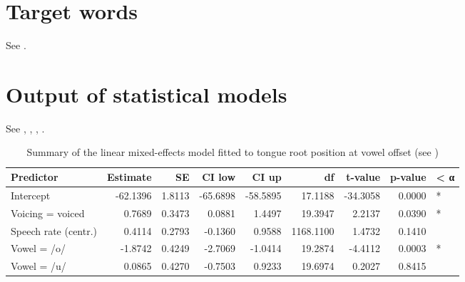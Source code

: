 \documentclass[preprint]{JASAnew}
\begin{document}
\appendix

\hypertarget{target-words}{%
\section{Target words}\label{target-words}}

\label{a:targets}

See .


\hypertarget{output-of-statistical-models}{%
\section{Output of statistical
models}\label{output-of-statistical-models}}

See , ,
, .

\begin{table}

\caption{\label{tab:tra-lm-table}Summary of the linear mixed-effects model fitted to tongue root position at vowel offset (see )}
\centering
\fontsize{10}{12}\selectfont
\begin{tabular}[t]{lrrrrrrrl}
\toprule
Predictor & Estimate & SE & CI low & CI up & df & t-value & p-value & < α\\
\midrule
Intercept & -62.1396 & 1.8113 & -65.6898 & -58.5895 & 17.1188 & -34.3058 & 0.0000 & *\\
Voicing = voiced & 0.7689 & 0.3473 & 0.0881 & 1.4497 & 19.3947 & 2.2137 & 0.0390 & *\\
Speech rate (centr.) & 0.4114 & 0.2793 & -0.1360 & 0.9588 & 1168.1100 & 1.4732 & 0.1410 & \\
Vowel = /o/ & -1.8742 & 0.4249 & -2.7069 & -1.0414 & 19.2874 & -4.4112 & 0.0003 & *\\
Vowel = /u/ & 0.0865 & 0.4270 & -0.7503 & 0.9233 & 19.6974 & 0.2027 & 0.8415 & \\
\bottomrule
\end{tabular}
\end{table}
\end{document}
